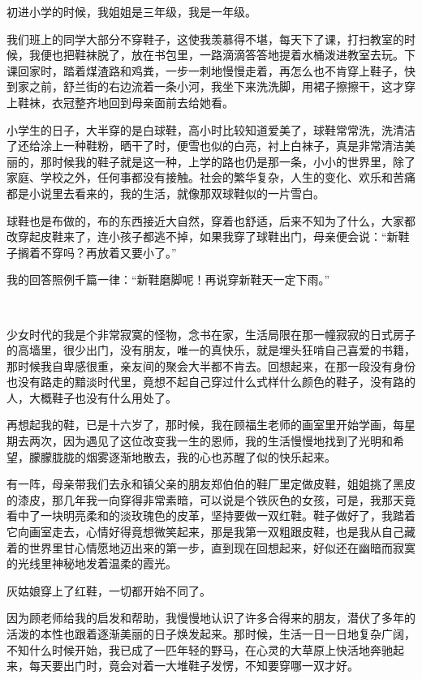 \par 初进小学的时候，我姐姐是三年级，我是一年级。
\par 我们班上的同学大部分不穿鞋子，这使我羡慕得不堪，每天下了课，打扫教室的时候，我便也把鞋袜脱了，放在书包里，一路滴滴答答地提着水桶泼进教室去玩。下课回家时，踏着煤渣路和鸡粪，一步一刺地慢慢走着，再怎么也不肯穿上鞋子，快到家之前，舒兰街的右边流着一条小河，我坐下来洗洗脚，用裙子擦擦干，这才穿上鞋袜，衣冠整齐地回到母亲面前去给她看。
\par 小学生的日子，大半穿的是白球鞋，高小时比较知道爱美了，球鞋常常洗，洗清洁了还给涂上一种鞋粉，晒干了时，便雪也似的白亮，衬上白袜子，真是非常清洁美丽的，那时候我的鞋子就是这一种，上学的路也仍是那一条，小小的世界里，除了家庭、学校之外，任何事都没有接触。社会的繁华复杂，人生的变化、欢乐和苦痛都是小说里去看来的，我的生活，就像那双球鞋似的一片雪白。
\par 球鞋也是布做的，布的东西接近大自然，穿着也舒适，后来不知为了什么，大家都改穿起皮鞋来了，连小孩子都逃不掉，如果我穿了球鞋出门，母亲便会说：“新鞋子搁着不穿吗？再放着又要小了。”
\par 我的回答照例千篇一律：“新鞋磨脚呢！再说穿新鞋天一定下雨。”
\par  
\par 少女时代的我是个非常寂寞的怪物，念书在家，生活局限在那一幢寂寂的日式房子的高墙里，很少出门，没有朋友，唯一的真快乐，就是埋头狂啃自己喜爱的书籍，那时候我自卑感很重，亲友间的聚会大半都不肯去。回想起来，在那一段没有身份也没有路走的黯淡时代里，竟想不起自己穿过什么式样什么颜色的鞋子，没有路的人，大概鞋子也没有什么用处了。
\par 再想起我的鞋，已是十六岁了，那时候，我在顾福生老师的画室里开始学画，每星期去两次，因为遇见了这位改变我一生的恩师，我的生活慢慢地找到了光明和希望，朦朦胧胧的烟雾逐渐地散去，我的心也苏醒了似的快乐起来。
\par 有一阵，母亲带我们去永和镇父亲的朋友郑伯伯的鞋厂里定做皮鞋，姐姐挑了黑皮的漆皮，那几年我一向穿得非常素暗，可以说是个铁灰色的女孩，可是，我那天竟看中了一块明亮柔和的淡玫瑰色的皮革，坚持要做一双红鞋。鞋子做好了，我踏着它向画室走去，心情好得竟想微笑起来，那是我第一双粗跟皮鞋，也是我从自己藏着的世界里甘心情愿地迈出来的第一步，直到现在回想起来，好似还在幽暗而寂寞的光线里神秘地发着温柔的霞光。
\par 灰姑娘穿上了红鞋，一切都开始不同了。
\par 因为顾老师给我的启发和帮助，我慢慢地认识了许多合得来的朋友，潜伏了多年的活泼的本性也跟着逐渐美丽的日子焕发起来。那时候，生活一日一日地复杂广阔，不知什么时候开始，我已成了一匹年轻的野马，在心灵的大草原上快活地奔驰起来，每天要出门时，竟会对着一大堆鞋子发愣，不知要穿哪一双才好。
